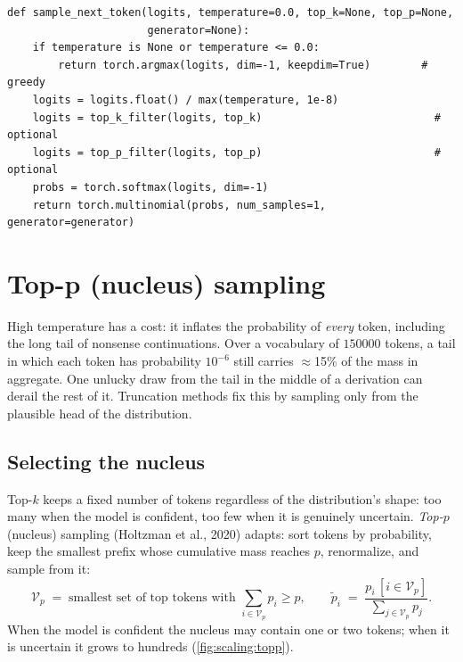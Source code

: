 \begin{lstlisting}[caption={Token selection used by every generator in the book.},label={lst:scaling:samplenext}]
def sample_next_token(logits, temperature=0.0, top_k=None, top_p=None,
                      generator=None):
    if temperature is None or temperature <= 0.0:
        return torch.argmax(logits, dim=-1, keepdim=True)        # greedy
    logits = logits.float() / max(temperature, 1e-8)
    logits = top_k_filter(logits, top_k)                           # optional
    logits = top_p_filter(logits, top_p)                           # optional
    probs = torch.softmax(logits, dim=-1)
    return torch.multinomial(probs, num_samples=1, generator=generator)
\end{lstlisting}

\section{Top-p (nucleus) sampling}\label{sec:scaling:topp}

High temperature has a cost: it inflates the probability of \emph{every} token, including the long
tail of nonsense continuations. Over a vocabulary of $\num{150000}$ tokens, a tail in which each
token has probability $10^{-6}$ still carries $\approx$15\% of the mass in aggregate. One unlucky
draw from the tail in the middle of a derivation can derail the rest of it. Truncation methods fix
this by sampling only from the plausible head of the distribution.

\subsection{Selecting the nucleus}\label{sec:scaling:nucleus}
Top-$k$ keeps a fixed number of tokens regardless of the distribution's shape: too many when the
model is confident, too few when it is genuinely uncertain. \emph{Top-$p$} (nucleus) sampling
(Holtzman et al., 2020) adapts: sort tokens by probability, keep the smallest prefix whose
cumulative mass reaches $p$, renormalize, and sample from it:
\begin{equation}
  \mathcal{V}_p \;=\; \text{smallest set of top tokens with } \textstyle\sum_{i \in \mathcal{V}_p} p_i \ge p,
  \qquad
  \tilde p_i \;=\; \frac{p_i \,[i \in \mathcal{V}_p]}{\sum_{j \in \mathcal{V}_p} p_j}.
\end{equation}
When the model is confident the nucleus may contain one or two tokens; when it is uncertain it
grows to hundreds (\cref{fig:scaling:topp}).


